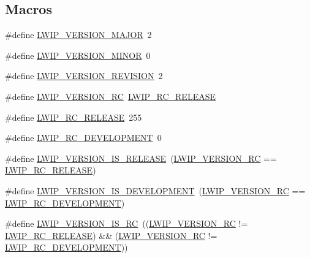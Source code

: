 \subsection*{Macros}
\begin{DoxyCompactItemize}
\item 
\#define \hyperlink{group__lwip__version_ga4308c06ef36496e00c798d96d7d03246}{L\+W\+I\+P\+\_\+\+V\+E\+R\+S\+I\+O\+N\+\_\+\+M\+A\+J\+OR}~2
\item 
\#define \hyperlink{group__lwip__version_ga1e596388c15ba81e753c5633fad1c034}{L\+W\+I\+P\+\_\+\+V\+E\+R\+S\+I\+O\+N\+\_\+\+M\+I\+N\+OR}~0
\item 
\#define \hyperlink{group__lwip__version_ga0a57983df1b199cf39a2e6a2d90e3d50}{L\+W\+I\+P\+\_\+\+V\+E\+R\+S\+I\+O\+N\+\_\+\+R\+E\+V\+I\+S\+I\+ON}~2
\item 
\#define \hyperlink{group__lwip__version_gac1dc92d8f453a98560de7e2e00a221a1}{L\+W\+I\+P\+\_\+\+V\+E\+R\+S\+I\+O\+N\+\_\+\+RC}~\hyperlink{group__lwip__version_ga375ee868e76ed7c458cdf249387bd469}{L\+W\+I\+P\+\_\+\+R\+C\+\_\+\+R\+E\+L\+E\+A\+SE}
\item 
\#define \hyperlink{group__lwip__version_ga375ee868e76ed7c458cdf249387bd469}{L\+W\+I\+P\+\_\+\+R\+C\+\_\+\+R\+E\+L\+E\+A\+SE}~255
\item 
\#define \hyperlink{group__lwip__version_ga9ca69b1a453eb72efd0bbda333f2a33b}{L\+W\+I\+P\+\_\+\+R\+C\+\_\+\+D\+E\+V\+E\+L\+O\+P\+M\+E\+NT}~0
\item 
\#define \hyperlink{group__lwip__version_gabba875b6b4e4ca2dce972f4beec4b726}{L\+W\+I\+P\+\_\+\+V\+E\+R\+S\+I\+O\+N\+\_\+\+I\+S\+\_\+\+R\+E\+L\+E\+A\+SE}~(\hyperlink{group__lwip__version_gac1dc92d8f453a98560de7e2e00a221a1}{L\+W\+I\+P\+\_\+\+V\+E\+R\+S\+I\+O\+N\+\_\+\+RC} == \hyperlink{group__lwip__version_ga375ee868e76ed7c458cdf249387bd469}{L\+W\+I\+P\+\_\+\+R\+C\+\_\+\+R\+E\+L\+E\+A\+SE})
\item 
\#define \hyperlink{group__lwip__version_ga5ccfb66bcbcf642a64f369ebefa2ad53}{L\+W\+I\+P\+\_\+\+V\+E\+R\+S\+I\+O\+N\+\_\+\+I\+S\+\_\+\+D\+E\+V\+E\+L\+O\+P\+M\+E\+NT}~(\hyperlink{group__lwip__version_gac1dc92d8f453a98560de7e2e00a221a1}{L\+W\+I\+P\+\_\+\+V\+E\+R\+S\+I\+O\+N\+\_\+\+RC} == \hyperlink{group__lwip__version_ga9ca69b1a453eb72efd0bbda333f2a33b}{L\+W\+I\+P\+\_\+\+R\+C\+\_\+\+D\+E\+V\+E\+L\+O\+P\+M\+E\+NT})
\item 
\#define \hyperlink{group__lwip__version_ga286a5221bb18242db9071479d8125b38}{L\+W\+I\+P\+\_\+\+V\+E\+R\+S\+I\+O\+N\+\_\+\+I\+S\+\_\+\+RC}~((\hyperlink{group__lwip__version_gac1dc92d8f453a98560de7e2e00a221a1}{L\+W\+I\+P\+\_\+\+V\+E\+R\+S\+I\+O\+N\+\_\+\+RC} != \hyperlink{group__lwip__version_ga375ee868e76ed7c458cdf249387bd469}{L\+W\+I\+P\+\_\+\+R\+C\+\_\+\+R\+E\+L\+E\+A\+SE}) \&\& (\hyperlink{group__lwip__version_gac1dc92d8f453a98560de7e2e00a221a1}{L\+W\+I\+P\+\_\+\+V\+E\+R\+S\+I\+O\+N\+\_\+\+RC} != \hyperlink{group__lwip__version_ga9ca69b1a453eb72efd0bbda333f2a33b}{L\+W\+I\+P\+\_\+\+R\+C\+\_\+\+D\+E\+V\+E\+L\+O\+P\+M\+E\+NT}))

\end{DoxyCompactItemize}
